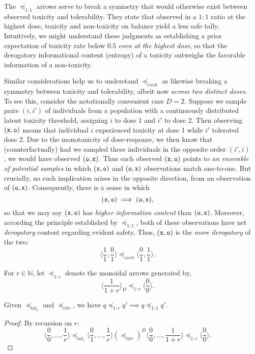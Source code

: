 \documentclass{article}
\newcommand{\N}{\mathbb{N}}
\begin{document}
The $\preceq_{1:1}$ arrows serve to break a symmetry that would otherwise exist between observed toxicity and tolerability.  They state that observed in a $1:1$ ratio at the highest dose, toxicity and non-toxicity on balance yield a less safe tally.  Intuitively, we might understand these judgments as establishing a prior expectation of toxicity rate below 0.5 {\em even at the highest dose}, so that the derogatory informational content (entropy) of a toxicity outweighs the favorable information of a non-toxicity.

Similar considerations help us to understand $\preceq_{exch}$ as likewise breaking a symmetry between toxicity and tolerability, albeit now {\em across two distinct doses}.  To see this, consider the notationally convenient case $D=2$.  Suppose we sample pairs $(i,i')$ of individuals from a population with a continuously distributed latent toxicity threshold, assigning $i$ to dose 1 and $i'$ to dose 2.  Then observing $(\tt{x},\tt{o})$ means that individual $i$ experienced toxicity at dose 1 while $i'$ tolerated dose 2.  Due to the monotonicity of dose-response, we then know that (counterfactually) had we sampled these individuals in the opposite order $(i',i)$, we would have observed $(\tt{o},\tt{x})$.  Thus each observed $(\tt{x},\tt{o})$ points to {\em an ensemble of potential samples} in which $(\tt{x},\tt{o})$ and $(\tt{o},\tt{x})$ observations match one-to-one.  But crucially, no such implication arises in the opposite direction, from an observation of $(\tt{o},\tt{x})$.  Consequently, there is a sense in which
$$
(\tt{x},\tt{o}) \implies (\tt{o},\tt{x}),
$$
so that we may say $(\tt{x},\tt{o})$ has {\em higher information content} than $(\tt{o},\tt{x})$.  Moreover, according the principle established by $\preceq_{1:1}$, both of these observations have net {\em derogatory} content regarding evident safety.  Thus, $(\tt{x},\tt{o})$ is the {\em more derogatory} of the two:
$$
\langle\frac{1}{1},\frac{0}{1}\rangle \preceq_{exch} \langle\frac{0}{1},\frac{1}{1}\rangle.
$$

\begin{nota}
  For $r \in \N$, let $\preceq_{1:r}$ denote the monoidal arrows generated by,
  $$
  \langle\frac{1}{1+r}\rangle_D \preceq_{1:r} \langle\frac{0}{0}\rangle.
  $$
\end{nota}

\begin{fact}\label{rimplies}
  Given $\preceq_{tol_1}$ and $\preceq_{titr}$, we have $q \preceq_{1:r} q' \implies q \preceq_{1:1} q'$.
\end{fact}
\begin{proof}
  By recursion on $r$:
  $$
  \langle\frac{0}{0},...,\frac{1}{r}\rangle \preceq_{tol_1} \langle\frac{0}{1},...,\frac{1}{r}\rangle (\preceq_{titr})^D \langle\frac{0}{0},...,\frac{1}{1+r}\rangle \preceq_{1:r} \langle\frac{0}{0}\rangle.
  $$
\end{proof}
\end{document}
